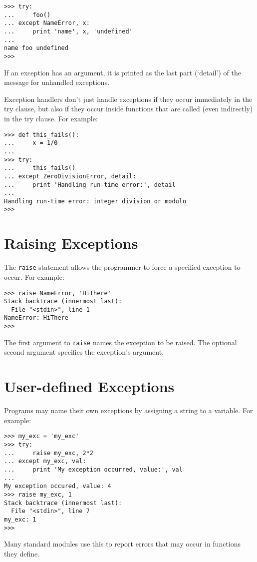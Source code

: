 \bcode\begin{verbatim}
>>> try:
...     foo()
... except NameError, x:
...     print 'name', x, 'undefined'
... 
name foo undefined
>>> 
\end{verbatim}\ecode
%
If an exception has an argument, it is printed as the last part
(`detail') of the message for unhandled exceptions.

Exception handlers don't just handle exceptions if they occur
immediately in the try clause, but also if they occur inside functions
that are called (even indirectly) in the try clause.
For example:

\bcode\begin{verbatim}
>>> def this_fails():
...     x = 1/0
... 
>>> try:
...     this_fails()
... except ZeroDivisionError, detail:
...     print 'Handling run-time error:', detail
... 
Handling run-time error: integer division or modulo
>>> 
\end{verbatim}\ecode

\section{Raising Exceptions}

The {\tt raise} statement allows the programmer to force a specified
exception to occur.
For example:

\bcode\begin{verbatim}
>>> raise NameError, 'HiThere'
Stack backtrace (innermost last):
  File "<stdin>", line 1
NameError: HiThere
>>> 
\end{verbatim}\ecode
%
The first argument to {\tt raise} names the exception to be raised.
The optional second argument specifies the exception's argument.

\section{User-defined Exceptions}

Programs may name their own exceptions by assigning a string to a
variable.
For example:

\bcode\begin{verbatim}
>>> my_exc = 'my_exc'
>>> try:
...     raise my_exc, 2*2
... except my_exc, val:
...     print 'My exception occurred, value:', val
... 
My exception occured, value: 4
>>> raise my_exc, 1
Stack backtrace (innermost last):
  File "<stdin>", line 7
my_exc: 1
>>> 
\end{verbatim}\ecode
%
Many standard modules use this to report errors that may occur in
functions they define.

